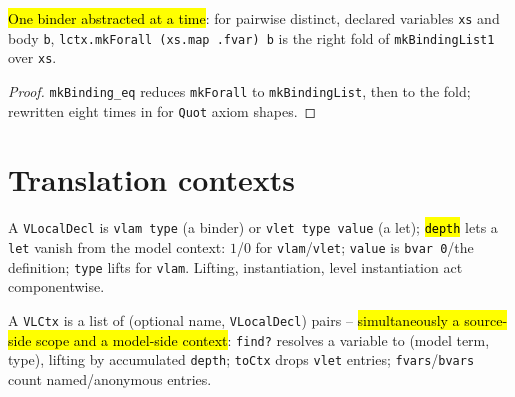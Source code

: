 \begin{theorem}
\label{thm:mkforall-eq-fold}
\leanok
{} 

 \hl{One binder abstracted at a time}: for pairwise distinct, declared variables \texttt{xs} and body \texttt{b}, \texttt{lctx.mkForall (xs.map .fvar) b} is the right fold of \texttt{mkBindingList1} over \texttt{xs}.
\end{theorem}
\begin{proof}
\leanok
{} \texttt{mkBinding\_eq} reduces \texttt{mkForall} to \texttt{mkBindingList}, then to the fold; rewritten eight times in  for \texttt{Quot} axiom shapes.
\end{proof}

\section{Translation contexts}

\begin{definition}
\label{ind:vt-vlocaldecl}
\leanok
{}
 A \texttt{VLocalDecl} is \texttt{vlam type} (a binder) or \texttt{vlet type value} (a let); \hl{\texttt{depth}} lets a \texttt{let} vanish from the model context: $1$/$0$ for \texttt{vlam}/\texttt{vlet}; \texttt{value} is \texttt{bvar 0}/the definition; \texttt{type} lifts for \texttt{vlam}. Lifting, instantiation, level instantiation act componentwise.
\end{definition}

\begin{definition}
\label{def:vt-vlctx}
\leanok
{}
 A \texttt{VLCtx} is a list of (optional name, \texttt{VLocalDecl}) pairs -- \hl{simultaneously a source-side scope and a model-side context}: \texttt{find?} resolves a variable to (model term, type), lifting by accumulated \texttt{depth}; \texttt{toCtx} drops \texttt{vlet} entries; \texttt{fvars}/\texttt{bvars} count named/anonymous entries.
\end{definition}

